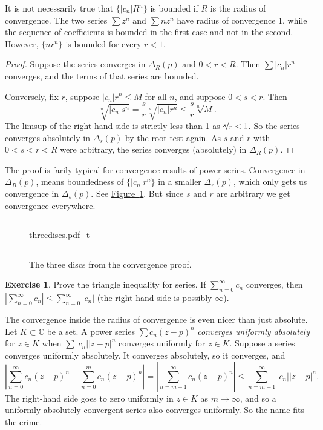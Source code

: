 \documentclass[12pt,openany]{book}
\newcommand{\sabs}[1]{\lvert {#1} \rvert}
\newcommand{\abs}[1]{\left\lvert {#1} \right\rvert}
\newcommand{\C}{{\mathbb{C}}}
\newcommand{\myindex}[1]{#1\index{#1}}
\theoremstyle{plain}
\theoremstyle{remark}
\theoremstyle{definition}
\newenvironment{exbox}{%
    \def\FrameCommand{\vrule width 1pt \relax\hspace{10pt}}%
    \MakeFramed{\advance\hsize-\width\FrameRestore}%
}{%
    \endMakeFramed
}
\newenvironment{myfig}{%
\begin{figure}[h!t]
\noindent\rule{\textwidth}{0.5pt}\vspace{12pt}\par\centering}%
{\par\noindent\rule{\textwidth}{0.5pt}
\end{figure}}
\theoremstyle{exercise}
\newtheorem{exercise}{Exercise}[section]
\theoremstyle{example}
\newcommand{\figureref}[1]{\hyperref[#1]{Figure~\ref*{#1}}}
\begin{document}
It is not necessarily true that $\bigl\{ \sabs{c_n} R^n \bigr\}$
is bounded if $R$ is the radius of convergence.
The two series $\sum z^n$ and $\sum n z^n$ have
radius of convergence 1, while the sequence of coefficients
is bounded in the first case and
not in the second.  However, $\{ n r^n \}$ is bounded for every $r < 1$.

\begin{proof}
Suppose the series converges in $\Delta_{R}(p)$ and
$0 < r < R$.  Then $\sum \sabs{c_n}r^n$ converges,
and the terms of that series are bounded.

Conversely, fix $r$, suppose 
$\sabs{c_n} r^n \leq M$ for all $n$, and suppose $0 < s < r$.
Then
\begin{equation*}
\sqrt[n]{\sabs{c_n} s^n}=
\frac{s}{r}\sqrt[n]{\sabs{c_n} r^n} \leq \frac{s}{r} \sqrt[n]{M} .
\end{equation*}
The limsup of the right-hand side is strictly less than 1 as $\nicefrac{s}{r} < 1$.
So the series converges absolutely in
$\overline{\Delta_s(p)}$ by the root test again.
As $s$ and $r$ with $0 < s < r < R$ were arbitrary,
the series converges (absolutely) in $\Delta_R(p)$.
\end{proof}

The proof is farily typical for convergence results of power series.
Convergence in $\Delta_R(p)$, means boundedness of
$\{ \sabs{c_n} r^n \}$ in a smaller $\Delta_r(p)$, which only gets us convergence
in $\Delta_s(p)$.  See \figureref{fig:threediscs}.  But since $s$ and $r$
are arbitrary we get convergence everywhere.
\begin{myfig}
{threediscs.pdf_t}
\caption{The three discs from the convergence proof.\label{fig:threediscs}}
\end{myfig}

\begin{exbox}
\begin{exercise}
Prove the triangle inequality for series.  If $\sum_{n=0}^\infty c_n$
converges, then $\abs{\sum_{n=0}^\infty c_n} \leq \sum_{n=0}^\infty
\sabs{c_n}$ (the right-hand side is possibly $\infty$).
\end{exercise}
\end{exbox}

The convergence inside the radius of convergence is even nicer than just absolute.
Let $K \subset \C$ be a set.
A power series $\sum c_n {(z-p)}^n$
\emph{\myindex{converges uniformly absolutely}}
for $z \in K$ when $\sum \sabs{c_n} \sabs{z-p}^n$
converges uniformly for $z \in K$.
Suppose a series converges uniformly absolutely.  It converges absolutely,
so it converges, and 
\begin{equation*}
\abs{
\sum_{n=0}^\infty c_n {(z-p)}^n
-
\sum_{n=0}^{m} c_n {(z-p)}^n
}
=
\abs{\sum_{n=m+1}^\infty c_n {(z-p)}^n} \leq
\sum_{n=m+1}^\infty \sabs{c_n} \sabs{z-p}^n .
\end{equation*}
The right-hand side goes to zero uniformly in $z \in K$ as $m \to \infty$,
and so
a uniformly absolutely convergent series also converges
uniformly.  So the name fits the crime.
\end{document}
